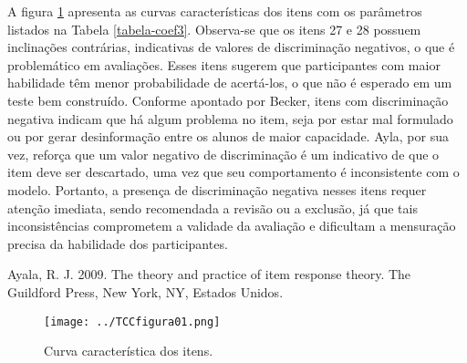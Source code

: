 A figura \ref{fig:curva_itens} apresenta as curvas características dos itens com os parâmetros listados na Tabela \ref{tabela-coef3}. Observa-se que os itens 27 e 28 possuem inclinações contrárias, indicativas de valores de discriminação negativos, o que é problemático em avaliações. Esses itens sugerem que participantes com maior habilidade têm menor probabilidade de acertá-los, o que não é esperado em um teste bem construído. Conforme apontado por Becker, itens com discriminação negativa indicam que há algum problema no item, seja por estar mal formulado ou por gerar desinformação entre os alunos de maior capacidade. Ayla, por sua vez, reforça que um valor negativo de discriminação é um indicativo de que o item deve ser descartado, uma vez que seu comportamento é inconsistente com o modelo. Portanto, a presença de discriminação negativa nesses itens requer atenção imediata, sendo recomendada a revisão ou a exclusão, já que tais inconsistências comprometem a validade da avaliação e dificultam a mensuração precisa da habilidade dos participantes.

Ayala, R. J. 2009. The theory and practice of item response theory. The Guildford Press, New York, NY, Estados Unidos.

\begin{figure}[H]
	\centering
	\texttt{[image: ../TCCfigura01.png]}
	\caption{Curva característica dos itens.}
	\label{fig:curva_itens}
\end{figure}



































